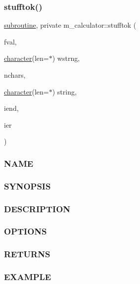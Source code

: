 \subsubsection{\texorpdfstring{stufftok()}{stufftok()}}
{\footnotesize\ttfamily \hyperlink{M__stopwatch_83_8txt_acfbcff50169d691ff02d4a123ed70482}{subroutine}, private m\+\_\+calculator\+::stufftok (\begin{DoxyParamCaption}\item[{}]{fval,  }\item[{\hyperlink{option__stopwatch_83_8txt_abd4b21fbbd175834027b5224bfe97e66}{character}(len=$\ast$)}]{wstrng,  }\item[{}]{nchars,  }\item[{\hyperlink{option__stopwatch_83_8txt_abd4b21fbbd175834027b5224bfe97e66}{character}(len=$\ast$)}]{string,  }\item[{}]{iend,  }\item[{}]{ier }\end{DoxyParamCaption})\hspace{0.3cm}{\ttfamily [private]}}



\subsubsection*{N\+A\+ME}

\subsubsection*{S\+Y\+N\+O\+P\+S\+IS}

\subsubsection*{D\+E\+S\+C\+R\+I\+P\+T\+I\+ON}

\subsubsection*{O\+P\+T\+I\+O\+NS}

\subsubsection*{R\+E\+T\+U\+R\+NS}

\subsubsection*{E\+X\+A\+M\+P\+LE}

